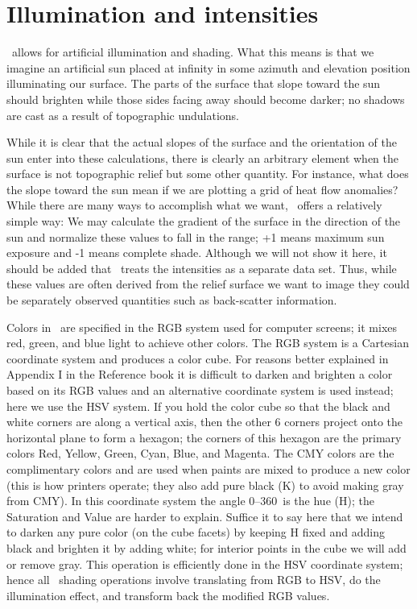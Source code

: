 \documentclass{report}
\begin{document}
\section{Illumination and intensities}

\GMT\ allows for artificial illumination and shading.  What this
means is that we imagine an artificial sun placed at infinity in
some azimuth and elevation position illuminating our surface.
The parts of the surface that slope toward the sun should brighten
while those sides facing away should become darker; no shadows are
cast as a result of topographic undulations.

While it is clear that the actual slopes of the surface and the
orientation of the sun enter into these calculations, there is
clearly an arbitrary element when the surface is not topographic
relief but some other quantity.  For instance, what does the slope
toward the sun mean if we are plotting a grid of heat flow anomalies?
While there are many ways to accomplish what we want, \GMT\ offers
a relatively simple way:  We may calculate the gradient of the surface
in the direction of the sun and normalize these values to fall in
the  range; +1 means maximum sun exposure and -1 means complete
shade. Although we will not show it here, it should be added that
\GMT\ treats the intensities as a separate data set.  Thus, while
these values are often derived from the relief surface we want to
image they could be separately observed quantities such as back-scatter
information.

Colors in \GMT\ are specified in the RGB system used for computer
screens; it mixes red, green, and blue light to achieve other colors.
The RGB system is a Cartesian coordinate system and produces a color cube.
For reasons better explained in Appendix I in the Reference book it is
difficult to darken and brighten a color based on its RGB values and an
alternative coordinate system is used instead; here we use the HSV system.
If you hold the color cube so that the black and white corners are along
a vertical axis, then the other 6 corners project onto the horizontal plane to
form a hexagon; the corners of this hexagon are the primary colors Red,
Yellow, Green, Cyan, Blue, and Magenta.
The CMY colors are the complimentary colors and are used when paints are
mixed to produce a new color (this is how printers operate; they also add
pure black (K) to avoid making gray from CMY).  In this coordinate system the
angle 0--360\DS\ is the hue (H); the Saturation and Value are harder to
explain.  Suffice it to say here that we intend to darken any pure color
(on the cube facets) by keeping H fixed and adding black and brighten it by adding white; for
interior points in the cube we will add or remove gray.
This operation is efficiently done in the HSV coordinate system; hence all
\GMT\ shading operations involve translating from RGB to HSV, do the
illumination effect, and transform back the modified RGB values.
\end{document}
